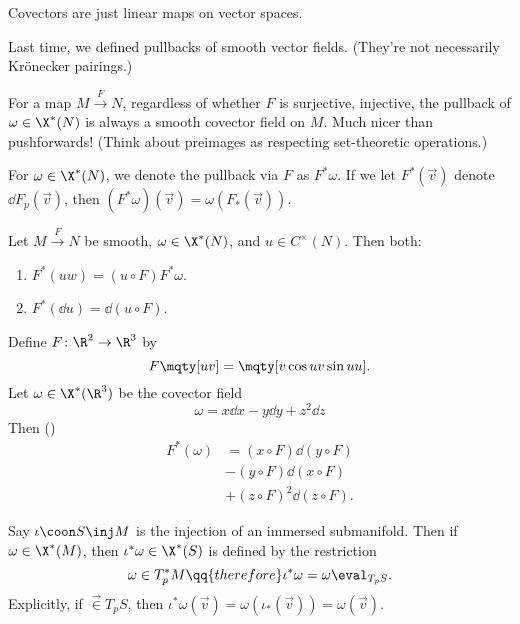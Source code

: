 Covectors are just linear maps on vector spaces. 

Last time, we defined  pullbacks of smooth vector fields. (They're not necessarily Krönecker pairings.) 

\begin{note}[]
   For a map $M \xrightarrow{F} N$, regardless of whether $F$ is surjective, injective, the pullback of $\omega \in \X^*(N)$ is always a smooth covector field on $M$. Much nicer than pushforwards! (Think about preimages as respecting set-theoretic operations.)
\end{note}

For $\omega \in \X^*(N)$, we denote the pullback via $F$ as $F^* \omega$. If we let $F^*(\vec v)$ denote $\dd{F_p} (\vec v)$, then $(F^* \omega)(\vec v) = \omega (F_*(\vec v))$.

\begin{prop}[]
    Let $M \xrightarrow{F} N$ be smooth, $\omega \in \X^*(N)$, and $u \in C^\times(N)$. Then both:
    \begin{enumerate}
        \item $F^*(uw) = (u \circ F)F^* \omega$.
        \item $F^*(\dd{u}) = \dd{ (u\circ F) }$.
    \end{enumerate}
\end{prop}

\begin{ex}[Helicoids]
    Define $F \colon \R^2 \to \R^3$ by 
    \begin{equation*}
        F\mqty[u\\ v] = \mqty[v\cos u\\ v\sin u\\ u].
    \end{equation*}
    Let $\omega \in  \X^*(\R^3)$ be the covector field
    \begin{equation*}
        \omega = x \dd{x} - y \dd{y} + z^2 \dd{z} 
    \end{equation*}
    Then (\TODO)
    \begin{align*}
        F^*(\omega) &= (x \circ F)\dd{(y \circ F)} \\
                    &- (y \circ F)\dd{(x \circ F)} \\
                    &+ (z \circ F)^2 \dd{(z \circ F)}.
    \end{align*}
\end{ex}

\begin{prop}
    Say $\iota \coon S \inj M$ is the injection of an immersed submanifold. Then if $\omega \in \X^*(M)$, then $\iota^* \omega \in \X^*(S)$ is defined by the restriction 
    \begin{equation*}
      \omega \in T_p^*M \qq{therefore} \iota^* \omega = \omega\eval_{T_p S}.
    \end{equation*}
Explicitly, if $\vec \in T_p S$, then $\iota^* \omega(\vec v) = \omega(\iota_*(\vec v)) = \omega(\vec v)$.
\end{prop}

